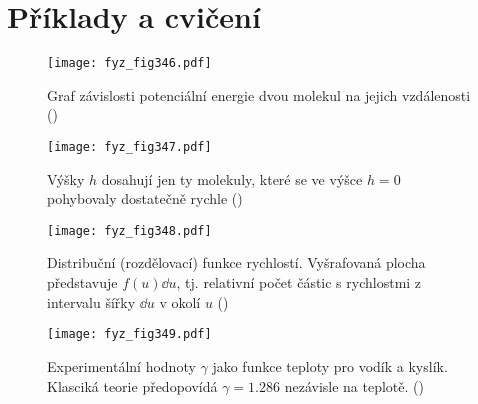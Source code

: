   \section{Příklady a cvičení}\label{fyz:IchapXLsecVII}
  
    \begin{figure}[ht!] %
      \centering
      \texttt{[image: fyz\_fig346.pdf]}
      \caption{Graf závislosti potenciální energie dvou molekul na jejich vzdálenosti
               (\cite[s.~543]{Feynman01})}
      \label{fyz_fig346}
    \end{figure}

    \begin{figure}[ht!] %
      \centering
      \texttt{[image: fyz\_fig347.pdf]}
      \caption{Výšky \(h\) dosahují jen ty molekuly, které se ve výšce \(h=0\) pohybovaly 
               dostatečně rychle
               (\cite[s.~545]{Feynman01})}
      \label{fyz_fig347}
    \end{figure}

    \begin{figure}[ht!] %
      \centering
      \texttt{[image: fyz\_fig348.pdf]}
      \caption{Distribuční (rozdělovací) funkce rychlostí. Vyšrafovaná plocha představuje 
               \(f(u)\dd{u}\), tj. relativní počet částic s rychlostmi z intervalu šířky \(\dd{u}\) 
               v okolí \(u\)
               (\cite[s.~525]{Feynman01})}
      \label{fyz_fig348}
    \end{figure}

    \begin{figure}[ht!] %
      \centering
      \texttt{[image: fyz\_fig349.pdf]}
      \caption{Experimentální hodnoty \(\gamma\) jako funkce teploty pro vodík a kyslík. Klasciká 
               teorie předopovídá \(\gamma =\num{1.286}\) nezávisle na teplotě. 
               (\cite[s.~525]{Feynman01})}
      \label{fyz_fig349}
    \end{figure}

\printbibliography[title={Seznam literatury}, heading=subbibliography]
